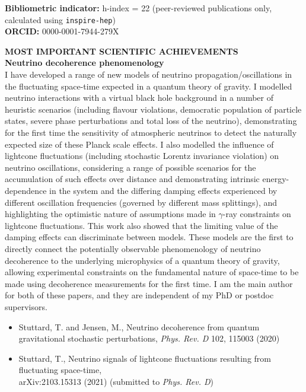 \documentclass[a4paper,11pt]{article}
\renewcommand{\smallskip} {\vspace{0.1in}}
\begin{document}
\textbf{Bibliometric indicator:} h-index = 22 (peer-reviewed publications only, calculated using \texttt{inspire-hep}) \\
\textbf{ORCID:} 0000-0001-7944-279X

\vspace{0.3cm}

\textbf{MOST IMPORTANT SCIENTIFIC ACHIEVEMENTS ~~\hrulefill}\smallskip\\
%
{\bf Neutrino decoherence phenomenology} \\ 
I have developed a range of new models of neutrino propagation/oscillations in the fluctuating space-time expected in a quantum theory of gravity. I modelled neutrino interactions with a virtual black hole background in a number of heuristic scenarios  (including flavour violations, democratic population of particle states, severe phase perturbations and total loss of the neutrino), demonstrating for the first time the sensitivity of atmospheric neutrinos to detect the naturally expected size of these Planck scale effects. I also modelled the influence of lightcone fluctuations (including stochastic Lorentz invariance violation) on neutrino oscillations, considering a range of possible scenarios for the accumulation of such effects over distance and demonstrating intrinsic energy-dependence in the system and the differing damping effects experienced by different oscillation frequencies (governed by different mass splittings), and highlighting the optimistic nature of assumptions made in $\gamma$-ray constraints on lightcone fluctuations. This work also showed that the limiting value of the damping effects can discriminate between models. These models are the first to directly connect the potentially observable phenomenology of neutrino decoherence to the underlying microphysics of a quantum theory of gravity, allowing experimental constraints on the fundamental nature of space-time to be made using decoherence measurements for the first time. I am the main author for both of these papers, and they are independent of my PhD or postdoc supervisors.

\begin{itemize}
  \item Stuttard, T. and Jensen, M., Neutrino decoherence from quantum gravitational stochastic perturbations, \textit{Phys. Rev. D} 102, 115003 (2020)
  \item Stuttard, T., Neutrino signals of lightcone fluctuations resulting from fluctuating space-time, \\ arXiv:2103.15313 (2021) (submitted to \textit{Phys. Rev. D})
\end{itemize}
\end{document}
